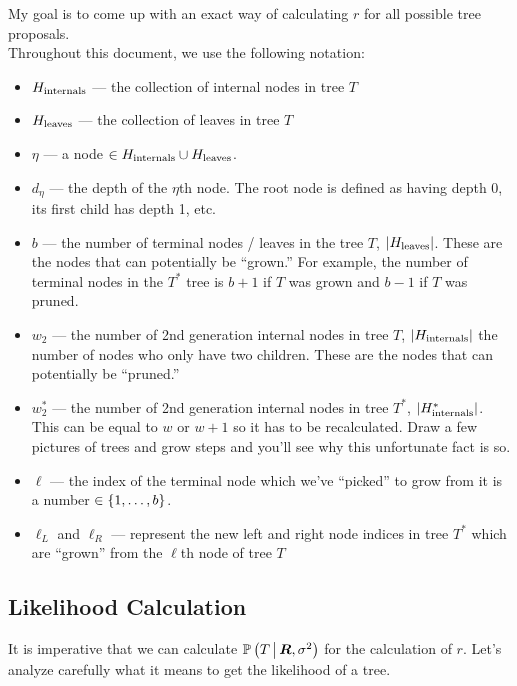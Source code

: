 My goal is to come up with an exact way of calculating $r$ for all possible tree proposals.\\

Throughout this document, we use the following notation:

\begin{itemize}
\item $H_{\text{internals}}$ ---  the collection of internal nodes in tree $T$
\item $H_{\text{leaves}}$ ---  the collection of leaves in tree $T$
\item $\eta$ --- a node $\in H_{\text{internals}} \cup H_{\text{leaves}}$.
\item $d_\eta$ --- the depth of the $\eta$th node. The root node is defined as having depth 0, its first child has depth 1, etc.
\item $b$ --- the number of terminal nodes / leaves in the tree $T$, $\left|H_{\text{leaves}}\right|$. These are the nodes that can potentially be ``grown.'' For example, the number of terminal nodes in the $T^*$ tree is $b+1$ if $T$ was grown and $b-1$ if $T$ was pruned.
\item $w_2$ --- the number of 2nd generation internal nodes in tree $T$, $\left|H_{\text{internals}}\right|$ \ie the number of nodes who only have two children. These are the nodes that can potentially be ``pruned.''
\item $w_2^*$ --- the number of 2nd generation internal nodes in tree $T^*$, $\left|H_{\text{internals}}^*\right|$. This can be equal to $w$ or $w+1$ so it has to be recalculated. Draw a few pictures of trees and grow steps and you'll see why this unfortunate fact is so.
\item  $\ell$ --- the index of the terminal node which we've ``picked'' to grow from it is a number $\in \left\{1, \ldots, b\right\}$.
\item $\ell_L$ and $\ell_R$ --- represent the new left and right node indices in tree $T^*$ which are ``grown'' from the $\ell$th node of tree $T$
\end{itemize}

\subsection*{Likelihood Calculation}

It is imperative that we can calculate $\mathbb{P}\left(T \, \big| \, \boldsymbol{R}, \sigma^2\right)$ for the calculation of $r$. Let's analyze carefully what it means to get the likelihood of a tree.

